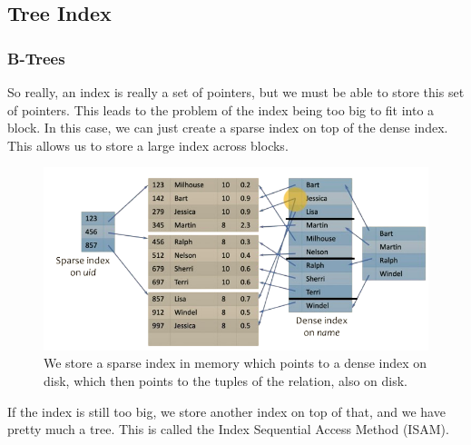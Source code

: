 \subsection{Tree Index} 

  \subsubsection{B-Trees}

    So really, an index is really a set of pointers, but we must be able to store this set of pointers. This leads to the problem of the index being too big to fit into a block. In this case, we can just create a sparse index on top of the dense index. This allows us to store a large index across blocks. 
    
    \begin{figure}[H]
      \centering 
      \includegraphics[scale=0.4]{img/too_big.png}
      \caption{We store a sparse index in memory which points to a dense index on disk, which then points to the tuples of the relation, also on disk. } 
      \label{fig:too_big}
    \end{figure}

    If the index is still too big, we store another index on top of that, and we have pretty much a tree. This is called the Index Sequential Access Method (ISAM). 
    
